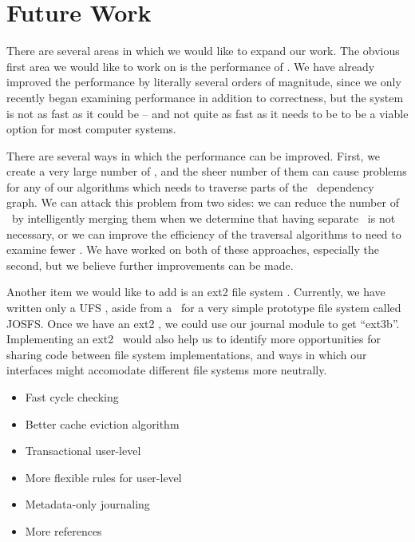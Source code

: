 \section {Future Work}
\label{sec:future}

There are several areas in which we would like to expand our work. The obvious
first area we would like to work on is the performance of \Kudos. We have
already improved the performance by literally several orders of magnitude, since
we only recently began examining performance in addition to correctness, but the
system is not as fast as it could be -- and not quite as fast as it needs to be
to be a viable option for most computer systems.

There are several ways in which the performance can be improved. First, we
create a very large number of \chdescs, and the sheer number of them can cause
problems for any of our algorithms which needs to traverse parts of the \chdesc\
dependency graph. We can attack this problem from two sides: we can reduce the
number of \chdescs\ by intelligently merging them when we determine that having
separate \chdescs\ is not necessary, or we can improve the efficiency of the
traversal algorithms to need to examine fewer \chdescs. We have worked on both
of these approaches, especially the second, but we believe further improvements
can be made.

Another item we would like to add is an ext2 file system \module. Currently,
we have written only a UFS \module, aside from a \module\ for a very simple
prototype file system called JOSFS. Once we have an ext2 \module, we could use
our journal module to get ``ext3b''. Implementing an ext2 \module\ would also
help us to identify more opportunities for sharing code between file system
implementations, and ways in which our interfaces might accomodate different
file systems more neutrally.

\begin{itemize}
\item Fast cycle checking
\item Better cache eviction algorithm
\item Transactional user-level \chdescs
\item More flexible rules for user-level \chdescs
\item Metadata-only journaling
\item More references
\end{itemize}
